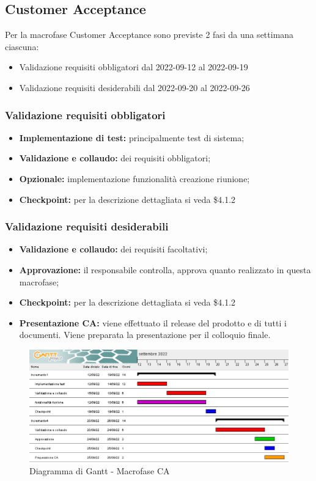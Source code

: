 \subsection{Customer Acceptance}
Per la macrofase Customer Acceptance sono previste 2 fasi da una settimana ciascuna:
\begin{itemize}
    \item Validazione requisiti obbligatori dal 2022-09-12 al 2022-09-19
    \item Validazione requisiti desiderabili dal 2022-09-20 al 2022-09-26
\end{itemize}
\subsubsection{Validazione requisiti obbligatori}
\begin{itemize}
    \item \textbf{Implementazione di test:} principalmente test di sistema;
    \item \textbf{Validazione e collaudo:} dei requisiti obbligatori;
    \item \textbf{Opzionale:} implementazione funzionalità creazione riunione;
    \item \textbf{Checkpoint:} per la descrizione dettagliata si veda \$4.1.2
\end{itemize}
\subsubsection{Validazione requisiti desiderabili}
\begin{itemize}
    \item \textbf{Validazione e collaudo:} dei requisiti facoltativi;
    \item \textbf{Approvazione:} il responsabile controlla, approva quanto realizzato in questa macrofase;
    \item \textbf{Checkpoint:} per la descrizione dettagliata si veda \$4.1.2
    \item \textbf{Presentazione CA:} viene effettuato il release del prodotto e di tutti i documenti. Viene preparata la presentazione per il colloquio finale.
\end{itemize}
\begin{figure}[H]
	\includegraphics[width=\linewidth]{images/CA.png}
    \caption{Diagramma di Gantt - Macrofase CA}
\end{figure}
\newpage